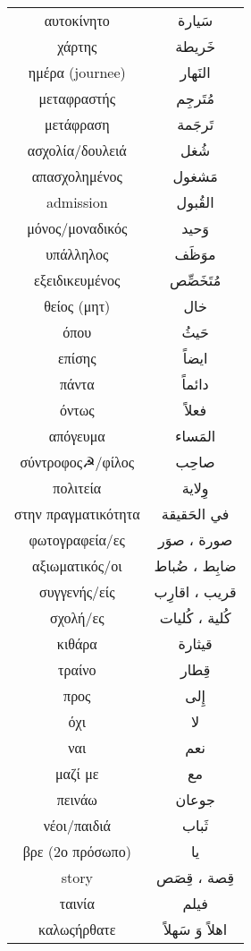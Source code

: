 \documentclass[twocolumn,a4paper]{article}
\newcommand{\ar}[1]{\textarabic{#1}}
\begin{document}
\begin{supertabular}{ c c }
αυτοκίνητο  & \ar{ سَيارة } \\
χάρτης      & \ar{ خَريطة } \\
ημέρα (journee) & \ar{ النَهار } \\
μεταφραστής     & \ar{ مُتَرجِم } \\
μετάφραση       & \ar{ تَرجَمة } \\
ασχολία/δουλειά & \ar{ شُغل } \\
απασχολημένος   & \ar{ مَشغول } \\
admission   & \ar{ القُبول } \\
μόνος/μοναδικός & \ar{ وَحيد } \\
υπάλληλος   & \ar{ موَظَف } \\
εξειδικευμένος  & \ar{ مُتَخَصِّص } \\
θείος (μητ) & \ar{ خال } \\
όπου        & \ar{ حَيثُ } \\
επίσης      & \ar{ ايضاً } \\
πάντα       & \ar{ دائماً } \\
όντως       & \ar{ فعلاً } \\
απόγευμα    & \ar{ المَساء } \\
σύντροφος☭/φίλος & \ar{ صاحِب } \\
πολιτεία    & \ar{ وِﻻية } \\
στην πραγματικότητα & \ar{ في الحَقيقة } \\
φωτογραφεία/ες & \ar{ صورة ، صوَر } \\
αξιωματικός/οι & \ar{ ضابِط ، ضُباط } \\
συγγενής/είς   & \ar{ قريب ، اقارِب } \\
σχολή/ες       & \ar{ كُلية ، كُليات } \\
κιθάρα         & \ar{ قيثارة } \\
τραίνο         & \ar{ قِطار } \\
προς           & \ar{ إِلى } \\
όχι            & \ar{ لا } \\
ναι            & \ar{ نعم } \\
μαζί με        & \ar{ مع } \\
πεινάω         & \ar{ جوعان } \\
νέοι/παιδιά    & \ar{ ثَباب } \\
βρε (2ο πρόσωπο) & \ar{ يا } \\
story          & \ar{ قِصة ، قِصَص } \\
ταινία         & \ar{ فيلم } \\
καλωςήρθατε    & \ar{ اهلاً وَ سَهلاً } \\

\end{supertabular}
\end{document}
